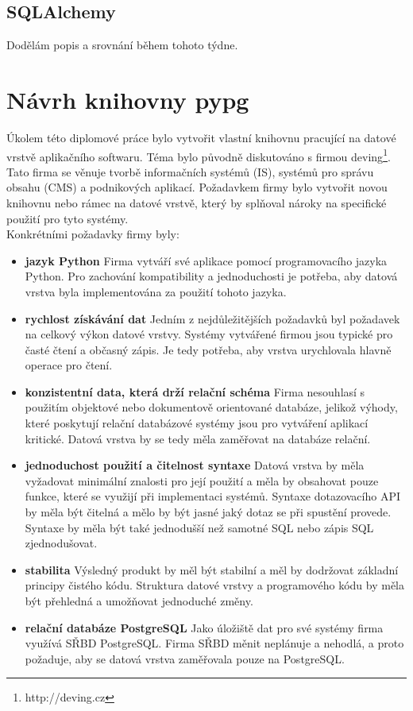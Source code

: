 \documentclass[ing,male,java,dept456]{diploma}						%
\begin{document}
\clearpage
\subsection{SQLAlchemy}
Dodělám popis a srovnání během tohoto týdne.

\section{Návrh knihovny pypg}
\label{sec:Design}

Úkolem této diplomové práce bylo vytvořit vlastní knihovnu pracující na datové vrstvě aplikačního softwaru. Téma bylo původně diskutováno s firmou deving\footnote{http://deving.cz}. Tato firma se věnuje tvorbě informačních systémů (IS), systémů pro správu obsahu (CMS) a podnikových aplikací. Požadavkem firmy bylo vytvořit novou knihovnu nebo rámec na datové vrstvě, který by splňoval nároky na specifické použití pro tyto systémy. \\
Konkrétními požadavky firmy byly:
\begin{itemize}
\item \textbf{jazyk Python} Firma vytváří své aplikace pomocí programovacího jazyka Python. Pro zachování kompatibility a jednoduchosti je potřeba, aby datová vrstva byla implementována za použití tohoto jazyka.
\item \textbf{rychlost získávání dat} Jedním z nejdůležitějších požadavků byl požadavek na celkový výkon datové vrstvy. Systémy vytvářené firmou jsou typické pro časté čtení a občasný zápis. Je tedy potřeba, aby vrstva urychlovala hlavně operace pro čtení. 
\item \textbf{konzistentní data, která drží relační schéma} Firma nesouhlasí s použitím objektové nebo dokumentově orientované databáze, jelikož výhody, které poskytují relační databázové systémy jsou pro vytváření aplikací kritické. Datová vrstva by se tedy měla zaměřovat na databáze relační.
\item \textbf{jednoduchost použití a čitelnost syntaxe} Datová vrstva by měla vyžadovat minimální znalosti pro její použití a měla by obsahovat pouze funkce, které se využijí při implementaci systémů. Syntaxe dotazovacího API by měla být čitelná a mělo by být jasné jaký dotaz se při spustění provede. Syntaxe by měla být také jednodušší než samotné SQL nebo zápis SQL zjednodušovat.
\item \textbf{stabilita} Výsledný produkt by měl být stabilní a měl by dodržovat základní principy čistého kódu. Struktura datové vrstvy a programového kódu by měla být přehledná a umožňovat jednoduché změny.
\item \textbf{relační databáze PostgreSQL} Jako úložiště dat pro své systémy firma využívá SŘBD PostgreSQL. Firma SŘBD měnit neplánuje a nehodlá, a proto požaduje, aby se datová vrstva zaměřovala pouze na PostgreSQL.
\end{itemize}
\end{document}
